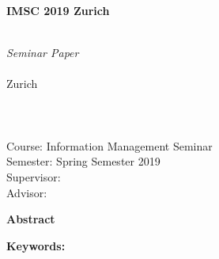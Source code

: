 \thispagestyle{empty}
\begin{center}

\begin{huge}
\textbf{IMSC 2019 Zurich} \\
\textbf{\longTitle}\\[1cm]
\end{huge}

\begin{large}
\textit{Seminar Paper} \\[1cm]
\textbf{\studentName}\\
Zurich\\
\studentNumber\\
\studentEmail\\
\studentStudies\\[0,5cm]

Course: Information Management Seminar\\

Semester: Spring Semester 2019\\
Supervisor: \supervisorName\\
Advisor: \advisorName\\[1cm]
\end{large}

\begin{large}
\textbf{Abstract}\\[0,5cm]
\end{large}

\end{center}

\begin{textit}
\abstract
\end{textit}
\newline

\textbf{Keywords:}
\keywords


